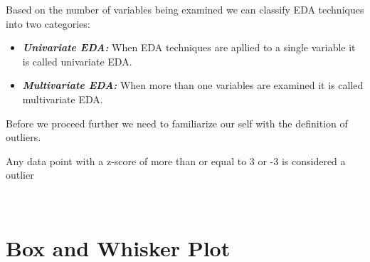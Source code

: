 \documentclass[twoside,12pt]{report}  %
\begin{document}
Based on the number of variables being examined we can classify EDA techniques into two categories:
\begin{itemize}
	\item \textbf{\textit{Univariate EDA:}} When EDA techniques are apllied to a single variable it is called univariate EDA.
	\item \textbf{\textit{Multivariate EDA:}} When more than one variables are examined it is called multivariate EDA.  
\end{itemize}
Before we proceed further we need to familiarize our self with the definition of outliers.
\begin{tcolorbox}[colback=red!5!white, colframe=red!75!black, title = \textbf{Outliers}]
	Any data point with a z-score of more than or equal to 3 or -3 is considered a outlier
\end{tcolorbox}
\noindent
\\
\section{Box and Whisker Plot}
\end{document}
